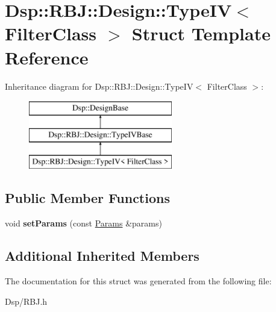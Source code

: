 \hypertarget{structDsp_1_1RBJ_1_1Design_1_1TypeIV}{\section{Dsp\-:\-:R\-B\-J\-:\-:Design\-:\-:Type\-I\-V$<$ Filter\-Class $>$ Struct Template Reference}
\label{structDsp_1_1RBJ_1_1Design_1_1TypeIV}
}
Inheritance diagram for Dsp\-:\-:R\-B\-J\-:\-:Design\-:\-:Type\-I\-V$<$ Filter\-Class $>$\-:\begin{figure}[H]
\begin{center}
\leavevmode
\includegraphics[height=3.000000cm]{structDsp_1_1RBJ_1_1Design_1_1TypeIV}
\end{center}
\end{figure}
\subsection*{Public Member Functions}
\begin{DoxyCompactItemize}
\item 
\hypertarget{structDsp_1_1RBJ_1_1Design_1_1TypeIV_a1672d2ad95aa7360f1c032e8254896b2}{void {\bfseries set\-Params} (const \hyperlink{structDsp_1_1Params}{Params} \&params)}\label{structDsp_1_1RBJ_1_1Design_1_1TypeIV_a1672d2ad95aa7360f1c032e8254896b2}

\end{DoxyCompactItemize}
\subsection*{Additional Inherited Members}


The documentation for this struct was generated from the following file\-:\begin{DoxyCompactItemize}
\item 
Dsp/R\-B\-J.\-h\end{DoxyCompactItemize}
